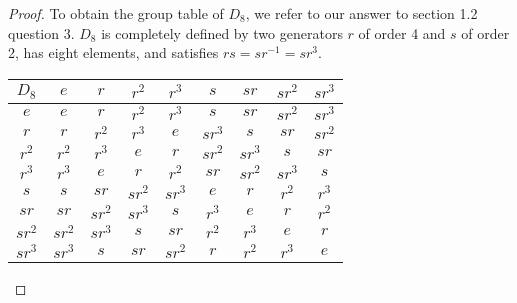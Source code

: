 \documentclass{article}
\begin{document}
\begin{enumerate}
\begin{enumerate}
\begin{proof}
          To obtain the group table of $D_8$, we refer to our answer to
          section 1.2 question 3. $D_8$ is completely defined by two
          generators $r$ of order 4 and $s$ of order 2, has eight elements,
          and satisfies $rs=sr^{-1}=sr^3$.
          \begin{center}
            \begin{tabular}{|c||c|c|c|c|c|c|c|c|}
              \hline
              $D_8$     & $e$   & $r$   & $r^2$   & $r^3$
                        & $s$   & $sr$  & $sr^2$  & $sr^3$ \\
              \hline\hline
              $e$       & $e$   & $r$   & $r^2$   & $r^3$
                        & $s$   & $sr$  & $sr^2$  & $sr^3$ \\
              \hline
              $r$       & $r$   & $r^2$ & $r^3$   & $e$
                        & $sr^3$& $s$   & $sr$    & $sr^2$ \\
              \hline
              $r^2$     & $r^2$ & $r^3$ & $e$     & $r$
                        & $sr^2$& $sr^3$& $s$     & $sr$ \\
              \hline
              $r^3$     & $r^3$ & $e$   & $r$     & $r^2$
                        & $sr$  & $sr^2$& $sr^3$  & $s$ \\
              \hline
              $s$       & $s$   & $sr$  & $sr^2$  & $sr^3$
                        & $e$   & $r$   & $r^2$   & $r^3$ \\
              \hline
              $sr$      & $sr$  & $sr^2$& $sr^3$  & $s$
                        & $r^3$ & $e$   & $r$     & $r^2$ \\
              \hline
              $sr^2$    & $sr^2$& $sr^3$& $s$     & $sr$
                        & $r^2$ & $r^3$ & $e$     & $r$ \\
              \hline
              $sr^3$    & $sr^3$& $s$   & $sr$    & $sr^2$
                        & $r$   & $r^2$ & $r^3$   & $e$ \\
              \hline
            \end{tabular}
          \end{center}


\end{proof}
\end{enumerate}
\end{enumerate}
\end{document}
